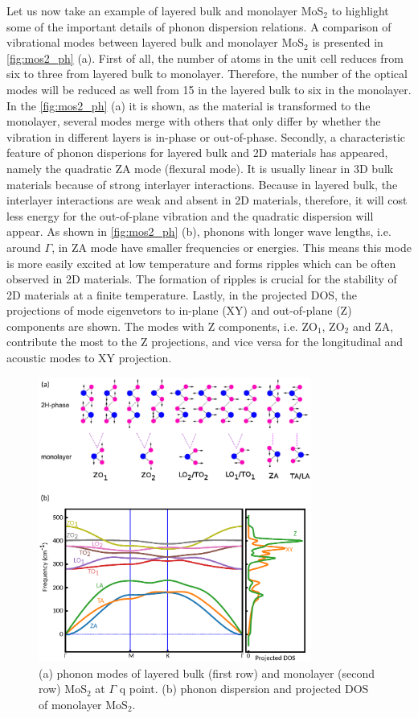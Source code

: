 Let us now take an example of layered bulk and monolayer MoS$_2$ to highlight some of the important details of phonon dispersion relations. A comparison of vibrational modes between layered bulk and monolayer MoS$_2$ is presented in \autoref{fig:mos2_ph} (a). First of all, the number of atoms in the unit cell reduces from six to three from layered bulk to monolayer. Therefore, the number of the optical modes will be reduced as well from 15 in the layered bulk to six in the monolayer. In the \autoref{fig:mos2_ph} (a) it is shown, as the material is transformed to the monolayer, several modes merge with others that only differ by whether the vibration in different layers is in-phase or out-of-phase. Secondly, a characteristic feature of phonon disperions for layered bulk and 2D materials has appeared, namely the quadratic ZA mode (flexural mode). It is usually linear in 3D bulk materials because of strong interlayer interactions. Because in layered bulk, the interlayer interactions are weak and absent in 2D materials, therefore, it will cost less energy for the out-of-plane vibration and the quadratic dispersion will appear. As shown in \autoref{fig:mos2_ph} (b), phonons with longer wave lengths, i.e. around $\Gamma$, in ZA mode have smaller frequencies or energies. This means this mode is more easily excited at low temperature and forms ripples which can be often observed in 2D materials. The formation of ripples is crucial for the stability of 2D materials at a finite temperature. Lastly, in the projected DOS, the projections of mode eigenvetors to in-plane (XY) and out-of-plane (Z) components are shown. The modes with Z components, i.e. ZO$_1$, ZO$_2$ and ZA, contribute the most to the Z projections, and vice versa for the longitudinal and acoustic modes to XY projection. 

\begin{figure}[htbp!] 
\centering  
\includegraphics[width=0.8\textwidth]{ph_mos2.eps}
\caption{(a) phonon modes of layered bulk (first row) and monolayer (second row) MoS$_2$ at $\Gamma$ q point. (b) phonon dispersion and projected DOS of monolayer MoS$_2$.}  
\label{fig:mos2_ph}
\end{figure} 


